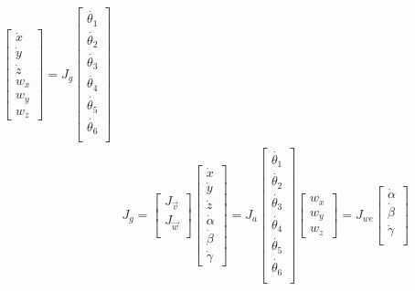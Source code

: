 \documentclass[12pt]{article}
\begin{document}
\begin{CJK}{UTF8}{bsmi}
\begin{equation*}
\begin{split}
\begin{bmatrix}
\dot{x} \\ 
\dot{y} \\ 
\dot{z}\\ 
w_x \\ 
w_y \\ 
w_z
\end{bmatrix}
=
J_g
\begin{bmatrix}
\dot{\theta _1} \\ 
\dot{\theta _2} \\ 
\dot{\theta _3} \\ 
\dot{\theta _4} \\ 
\dot{\theta _5} \\ 
\dot{\theta _6} \\ 
\end{bmatrix}	\\
&J_g = 							
\begin{bmatrix}
J_{\vec{v}}\\ 
J_{\vec{w}} \\ 
\end{bmatrix}
\begin{bmatrix}
\dot{x} \\ 
\dot{y} \\ 
\dot{z}\\ 
\dot{\alpha} \\ 
\dot{\beta} \\ 
\dot{\gamma}
\end{bmatrix}
=
J_a
\begin{bmatrix}
\dot{\theta _1} \\ 
\dot{\theta _2} \\ 
\dot{\theta _3} \\ 
\dot{\theta _4} \\ 
\dot{\theta _5} \\ 
\dot{\theta _6} \\ 
\end{bmatrix}
\begin{bmatrix}
w_x \\
w_y \\ 
w_z
\end{bmatrix}
=
J_{we}
\begin{bmatrix}
\dot{\alpha } \\ 
\dot{\beta } \\
\dot{\gamma } \\
\end{bmatrix}\\

\end{split}
\end{equation*}
\end{CJK}
\end{document}
